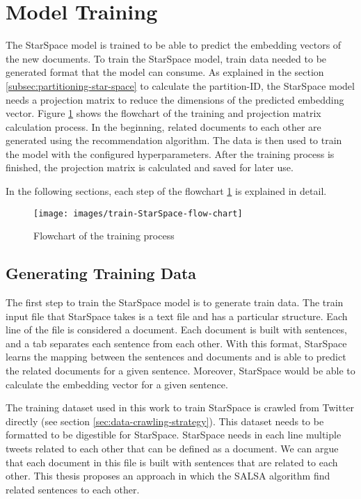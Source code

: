 \section{Model Training}
\label{sec:model-training}
The StarSpace model is trained to be able to predict the embedding vectors of the new documents. To train the StarSpace model, train data needed to be generated format that the model can consume. As explained in the section \ref{subsec:partitioning-star-space} to calculate the partition-ID, the StarSpace model needs a projection matrix to reduce the dimensions of the predicted embedding vector. Figure \ref{fig:star-space-training} shows the flowchart of the training and projection matrix calculation process. In the beginning, related documents to each other are generated using the recommendation algorithm. The data is then used to train the model with the configured hyperparameters. After the training process is finished, the projection matrix is calculated and saved for later use.

In the following sections, each step of the flowchart \ref{fig:star-space-training} is explained in detail.

\begin{figure}[!h]
    \centering
    \texttt{[image: images/train-StarSpace-flow-chart]}
    \caption{Flowchart of the training process}
    \label{fig:star-space-training}
\end{figure}

\subsection{Generating Training Data}
\label{subsec:generating-training-data}
The first step to train the StarSpace model is to generate train data. The train input file that StarSpace takes is a text file and has a particular structure. Each line of the file is considered a document. Each document is built with sentences, and a tab separates each sentence from each other. With this format, StarSpace learns the mapping between the sentences and documents and is able to predict the related documents for a given sentence. Moreover, StarSpace would be able to calculate the embedding vector for a given sentence.


The training dataset used in this work to train StarSpace is crawled from Twitter directly (see section \ref{sec:data-crawling-strategy}). This dataset needs to be formatted to be digestible for StarSpace. StarSpace needs in each line multiple tweets related to each other that can be defined as a document. We can argue that each document in this file is built with sentences that are related to each other. This thesis proposes an approach in which the SALSA algorithm find related sentences to each other.


